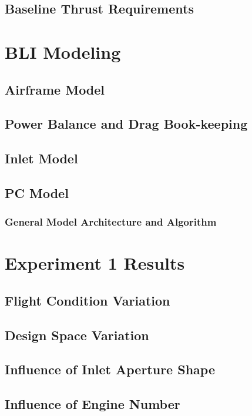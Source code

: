 \documentclass[12pt]{gatech-thesis}
\begin{document}
\subsection{Baseline Thrust Requirements}
\section{BLI Modeling}
\subsection{Airframe Model}
\subsection{Power Balance and Drag Book-keeping}
\subsection{Inlet Model}
\subsection{PC Model}
\subsubsection{General Model Architecture and Algorithm}

\section{Experiment 1 Results}

\subsection{Flight Condition Variation}

\subsection{Design Space Variation}

\subsection{Influence of Inlet Aperture Shape}

\subsection{Influence of Engine Number}
\end{document}
